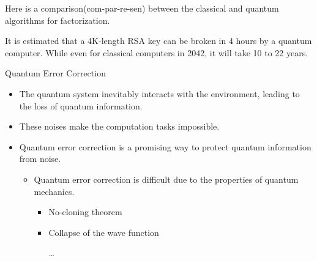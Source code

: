 \documentclass[10pt]{beamer}
\begin{document}
\begin{CJK}{UTF8}{gbsn}
{%

Here is a comparison(com-par-re-sen) between the classical and quantum algorithms for factorization.

It is estimated that a 4K-length RSA key can be broken in 4 hours by a quantum computer. While even for classical computers in 2042, it will take 10 to 22 years.}


\begin{frame}[fragile]{Quantum Error Correction}
  \begin{itemize}
    \item The quantum system inevitably interacts with the environment, leading to the loss of quantum information.
    \item These noises make the computation tasks impossible.
    \item Quantum error correction is a promising way to protect quantum information from noise.
    \begin{itemize}
      \item Quantum error correction is difficult due to the properties of quantum mechanics.
      \begin{itemize} 
      \item No-cloning theorem
      \item Collapse of the wave function
      
      \dots
      \end{itemize}
    \end{itemize}
  \end{itemize}
\end{frame}
\end{CJK}
\end{document}
